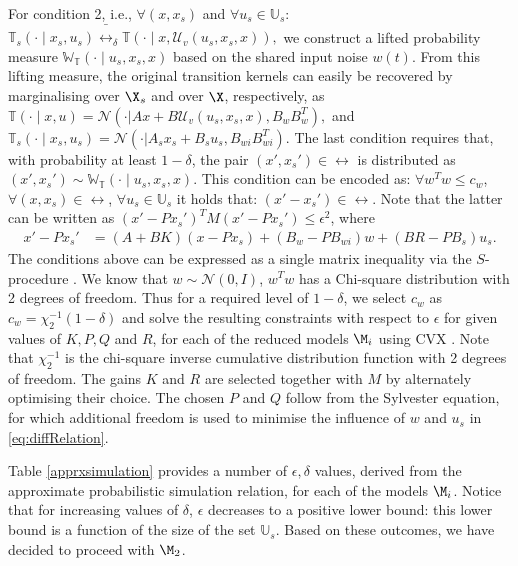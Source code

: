\documentclass[letterpaper, 10 pt, conference]{amsart}
\theoremstyle{definition}
\theoremstyle{example}
\theoremstyle{remark}
\newcommand{\eps}{\epsilon}
\newcommand{\InF}{\mathcal{U}_{v}}
\begin{document}
\noindent For condition 2, i.e., 
$\forall (x,x_s)$ and $\forall u_s \in \mathbb U_s$:  
\(\mathbb T_s\left(\cdot\mid x_s,u_s \right)\bar \rel_\delta \mathbb T\left(\cdot\mid x,\InF(u_s,x_s,x) \right),\)
we construct a lifted probability measure $\mathbb W_{\mathbb T}(\cdot\mid u_s,x_s,x)$ based on the shared input noise $w(t)$. 
From this lifting measure, 
the original transition kernels can easily be recovered by marginalising over $\X_s$ and over $\X$, respectively, as 
\(\mathbb T\left(\cdot\mid x,u\right) = \mathcal{N}(\cdot| Ax+B\InF(u_s,x_s,x),B_wB_w^T),\) and \( 
 \mathbb T_s\left(\cdot\mid x_s,u_s\right) = \mathcal{N}(\cdot| A_sx_s+B_su_s,B_{wi}B_{wi}^T).\)
The last condition requires that, 
 with probability at least $1-\delta$,  
the pair $(x', x_s') \in \rel$ is distributed as $(x', x_s')
 \sim \mathbb W_{\mathbb T}\left(\cdot\mid  u_s,x_s,x\right) $.  This condition can be encoded as:
$\forall w^T w\leq c_w$, $\forall (x,x_s)\in\rel$, $\forall u_s\in \mathbb U_s$ it holds that:  $(x'-x_s')\in \rel.$
Note that the latter can be written as $ (x'- P x_s')^TM (x'- P x_s')\leq \eps^2$, where   
\begin{align} \label{eq:diffRelation}
x'- P x_s'&=(A +BK)(x- P x_s) + (B_w -PB_{wi}) w  +( BR   -PB_s) u_s.
  \end{align}
The conditions above 
can be expressed as a single matrix inequality  via the $S$-procedure  \cite{Boyd2004}.
We know that $w\sim \mathcal{N}(0,I)$, $w^Tw$ has a Chi-square distribution with 2 degrees of freedom. Thus for a required level of $1-\delta$, we select $c_w$  as  $c_w=\chi_2^{-1}(1-\delta)$ and solve the resulting constraints with respect to $\epsilon$ for given values of $K,P,Q$ and $R$, 
for each of the reduced models $\M_i$ using CVX \cite{cvx}.  Note that $\chi_2^{-1}$ is  the chi-square inverse cumulative distribution function with 2 degrees of freedom.
The gains $K$ and $R$ are selected together with $M$  by alternately optimising their choice. 
The chosen $P$ and $Q$ follow from the Sylvester equation,  
for which additional freedom is used to minimise the influence of $w$ and $u_s$ in \eqref{eq:diffRelation}. 
 
Table \ref{apprxsimulation} provides a number of $\epsilon,\delta$ values, 
derived from the approximate probabilistic simulation relation, for each of the models $\M_i$. 
Notice that for increasing values of $\delta$, $\epsilon$ decreases to a positive lower bound: 
this lower bound is a function of the size of the set $\mathbb U_s$. 
Based on these outcomes, we have decided to proceed with $\M_2$. 
\end{document}
